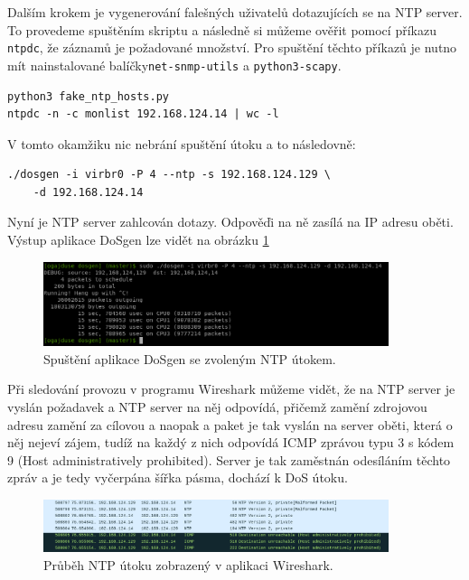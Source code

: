 Dalším krokem je vygenerování falešných uživatelů dotazujících se na NTP server. To provedeme spuštěním skriptu a následně si můžeme ověřit pomocí příkazu \texttt{ntpdc}, že záznamů je požadované množství. Pro spuštění těchto příkazů je nutno mít nainstalované balíčky\texttt{net-snmp-utils} a \texttt{python3-scapy}.

\begin{lstlisting}
python3 fake_ntp_hosts.py
ntpdc -n -c monlist 192.168.124.14 | wc -l
\end{lstlisting}

\noindent V tomto okamžiku nic nebrání spuštění útoku a to následovně:
\begin{lstlisting}
./dosgen -i virbr0 -P 4 --ntp -s 192.168.124.129 \
	-d 192.168.124.14
\end{lstlisting}

Nyní je NTP server zahlcován dotazy. Odpověďi na ně zasílá na IP adresu oběti. Výstup aplikace DoSgen lze vidět na obrázku \ref{fig:dosgen_run_ntp-img}

\begin{figure} [ht]
	\centering
	\includegraphics[width=0.9\textwidth]{obrazky/dosgen_terminal_run_ntp.png}
	\caption{Spuštění aplikace DoSgen se zvoleným NTP útokem.}
	\label{fig:dosgen_run_ntp-img}
\end{figure}

Při sledování provozu v programu Wireshark můžeme vidět, že na NTP server je vyslán požadavek  a NTP server na něj odpovídá, přičemž zamění zdrojovou adresu zamění za cílovou a naopak a paket je tak vyslán na server oběti, která o něj nejeví zájem, tudíž na každý z nich odpovídá ICMP zprávou typu 3 s kódem 9 (Host administratively prohibited). Server je tak zaměstnán odesíláním těchto zpráv a je tedy vyčerpána šířka pásma, dochází k DoS útoku.

\begin{figure} [h]
	\centering
	\includegraphics[width=0.9\textwidth]
	{obrazky/mon_getlist_1_wireshark_with_icmp_and_reply.png}
	\caption{Průběh NTP útoku zobrazený v  aplikaci Wireshark.}
	\label{fig:mon_getlist_1_wireshark_with_icmp_and_reply-img}
\end{figure}

